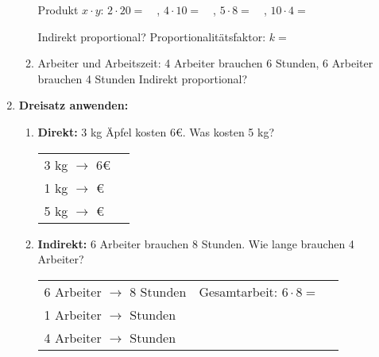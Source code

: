 \begin{enumerate}[label=\arabic*.]
\begin{enumerate}[label=\alph*)]
        Produkt $x \cdot y$: $2 \cdot 20 = \phantom{00}$, $4 \cdot 10 = \phantom{00}$, $5 \cdot 8 = \phantom{00}$, $10 \cdot 4 = \phantom{00}$

        Indirekt proportional? \underline{\hspace{2cm}} Proportionalitätsfaktor: $k = \phantom{00}$
        \vspace{0.5cm}

        \item Arbeiter und Arbeitszeit: 4 Arbeiter brauchen 6 Stunden, 6 Arbeiter brauchen 4 Stunden
        Indirekt proportional? \underline{\hspace{2cm}}
    \end{enumerate}

    \vspace{1cm}

    \item \textbf{Dreisatz anwenden:}
    \vspace{0.5cm}

    \begin{enumerate}[label=\alph*)]
        \item \textbf{Direkt:} 3 kg Äpfel kosten 6€. Was kosten 5 kg?

        \begin{tabular}{ll}
            3 kg $\rightarrow$ 6€ & \\
            1 kg $\rightarrow$ \underline{\hspace{1cm}}€ & \\
            5 kg $\rightarrow$ \underline{\hspace{1cm}}€ &
        \end{tabular}
        \vspace{0.5cm}

        \item \textbf{Indirekt:} 6 Arbeiter brauchen 8 Stunden. Wie lange brauchen 4 Arbeiter?
        
        \begin{tabular}{ll}
            6 Arbeiter $\rightarrow$ 8 Stunden & Gesamtarbeit: $6 \cdot 8 = \phantom{00}$ \\
            1 Arbeiter $\rightarrow$ \underline{\hspace{1cm}} Stunden & \\
            4 Arbeiter $\rightarrow$ \underline{\hspace{1cm}} Stunden &
        \end{tabular}
    \end{enumerate}

\end{enumerate}